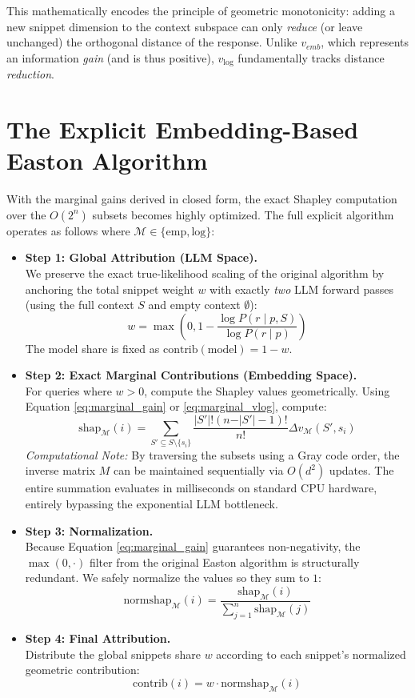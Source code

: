 \documentclass{article}
\begin{document}
This mathematically encodes the principle of geometric monotonicity: adding a new snippet dimension to the context subspace can only \textit{reduce} (or leave unchanged) the orthogonal distance of the response. Unlike $v_{emb}$, which represents an information \textit{gain} (and is thus positive), $v_{\log}$ fundamentally tracks distance \textit{reduction}.


\section{The Explicit Embedding-Based Easton Algorithm}

With the marginal gains derived in closed form, the exact Shapley computation over the $O(2^n)$ subsets becomes highly optimized. The full explicit algorithm operates as follows where $\mathcal{M} \in \{\text{emp}, \text{log} \}$:

\begin{itemize}
    \item \textbf{Step 1: Global Attribution (LLM Space).} \\
    We preserve the exact true-likelihood scaling of the original algorithm by anchoring the total snippet weight $w$ with exactly \textit{two} LLM forward passes (using the full context $S$ and empty context $\emptyset$):
    $$w = \max\left(0, 1 - \frac{\log P(r \mid p, S)}{\log P(r \mid p)}\right)$$
    The model share is fixed as $\text{contrib}(\text{model}) = 1 - w$.
    
    \item \textbf{Step 2: Exact Marginal Contributions (Embedding Space).} \\
    For queries where $w > 0$, compute the Shapley values geometrically. Using Equation \eqref{eq:marginal_gain} or \eqref{eq:marginal_vlog}, compute:
    $$ \text{shap}_{\mathcal{M}}(i) = \sum_{S' \subseteq S \setminus \{s_i\}} \frac{\vert S' \vert ! (n - \vert S' \vert - 1)!}{n!} \Delta v_{\mathcal{M}}(S', s_i) $$
    \textit{Computational Note:} By traversing the subsets using a Gray code order, the inverse matrix $M$ can be maintained sequentially via $O(d^2)$ updates. The entire summation evaluates in milliseconds on standard CPU hardware, entirely bypassing the exponential LLM bottleneck.
    
    \item \textbf{Step 3: Normalization.} \\
    Because Equation \ref{eq:marginal_gain} guarantees non-negativity, the $\max(0, \cdot)$ filter from the original Easton algorithm is structurally redundant. We safely normalize the values so they sum to $1$:
    $$ \text{normshap}_{\mathcal{M}}(i) = \frac{\text{shap}_{\mathcal{M}}(i)}{\sum_{j=1}^n \text{shap}_{\mathcal{M}}(j)} $$
    
    \item \textbf{Step 4: Final Attribution.} \\
    Distribute the global snippets share $w$ according to each snippet's normalized geometric contribution:
    $$ \text{contrib}(i) = w \cdot \text{normshap}_{\mathcal{M}}(i) $$
\end{itemize}
\end{document}
